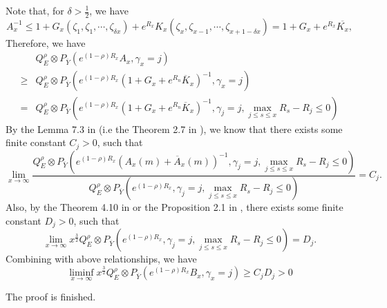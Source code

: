 \documentclass[]{article}
\makeatletter
\numberwithin{equation}{section}
\renewenvironment{proof}[1][\proofname]{%
	\par\pushQED{\qed}\normalfont%
	\topsep6\p@\@plus6\p@\relax
	\trivlist\item[\hskip\labelsep\bfseries#1\@addpunct{.}]%
	\ignorespaces
}{%
	\popQED\endtrivlist\@endpefalse
}
\theoremstyle{thmstyleone}%
\theoremstyle{thmstyletwo}%
\theoremstyle{thmstylethree}%
\theoremstyle{thmstylefour}%
\theoremstyle{thmstylefive}%
\theoremstyle{thmstylesix}%
\makeatother
\begin{document}
\begin{proof}[Proof of \Cref{lemma of weakly 1}]
		Note that, for $\delta>\frac{1}{2}$, we have
		\begin{equation}
			A_x^{-1}
			\leqslant
			1+ G_x(\zeta_1,\zeta_1,\cdots,\zeta_{\delta x})
			+
			e^{R_x} K_x(\zeta_{x},\zeta_{x-1},\cdots,\zeta_{x+1-\delta x})=
			1+G_x+e^{R_x} \overline{K_x},
		\end{equation}
		Therefore, we have
		\begin{align}
			&Q_E^\rho\otimes P_{\overline{Y}}
			\left(e^{(1-\rho)R_x}A_x,\gamma_x=j\right)
			\nonumber\\
			\geqslant&
			Q_E^\rho\otimes P_{\overline{Y}}
			\left(e^{(1-\rho)R_x} \left(1+G_x+e^{R_n} \overline{K}_x \right)^{-1} ,\gamma_x=j\right)
			\nonumber\\
			= &Q_E^\rho\otimes P_{\overline{Y}}
			\left(e^{(1-\rho)R_x} \left(1+G_x+e^{R_n} \overline{K}_x\right)^{-1} ,\gamma_j=j,\max_{j\leqslant s\leqslant x} R_s-R_j\leqslant 0\right)\nonumber
		\end{align}
		By the Lemma 7.3 in \cite{B2} (i.e the Theorem 2.7 in \cite{Afanasyev2012}), we know that there exists some finite constant $C_j>0$, such that
		\begin{equation}
			\lim\limits_{x\rightarrow\infty} \dfrac{Q_E^\rho\otimes P_{\overline{Y}}
				\left(e^{(1-\rho)R_x} \left(A_x(m)+\overline{A}_x(m)\right)^{-1} ,\gamma_j=j,\max_{j\leqslant s\leqslant x} R_s-R_j\leqslant 0\right)}{Q_E^\rho\otimes P_{\overline{Y}}\left(
				e^{(1-\rho)R_x}, \gamma_j=j, \max_{j\leqslant s\leqslant x} R_s-R_j\leqslant 0
				\right) } =C_j.
		\end{equation}
		Also, by the Theorem 4.10 in \cite{B2} or the Proposition 2.1 in \cite{Afanasyev2012}, there exists some finite constant $D_j>0$, such that
		\begin{equation}
			\lim\limits_{x\rightarrow\infty}x^{\frac{3}{2}}Q_E^\rho\otimes P_{\overline{Y}}\left(
			e^{(1-\rho)R_x}, \gamma_j=j, \max_{j\leqslant s\leqslant x} R_s-R_j\leqslant 0
			\right) = D_j.
		\end{equation}
		Combining with above relationships, we have
		\begin{equation}
			\liminf\limits_{x\rightarrow\infty} x^{\frac{3}{2}}
			Q_E^\rho\otimes P_{\overline{Y}}
			\left(e^{(1-\rho)R_x}B_x,\gamma_x=j\right)\geqslant C_j D_j>0
		\end{equation}
		
		The proof is finished.
	\end{proof}
	
\end{document}
